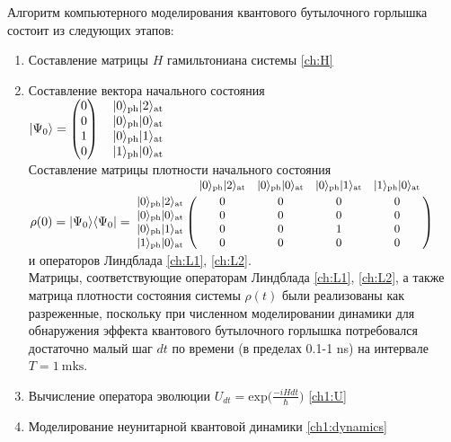 Алгоритм компьютерного моделирования квантового бутылочного горлышка состоит из следующих этапов:
\begin{enumerate}
\item{
	Составление матрицы $H$ гамильтониана системы \eqref{ch:H}\\
}
\item{
Составление вектора начального состояния\\
$
	|\Psi_{0}\rangle = 
	\begin{pmatrix}
		0 \\ 
		0 \\
		1 \\
		0 
	\end{pmatrix}
	\begin{matrix}
    	\quad|0\rangle_{\text{\text{ph}}}|2\rangle_{\text{\text{at}}} \cr
		\quad|0\rangle_{\text{\text{ph}}}|0\rangle_{\text{\text{at}}} \cr
    	\quad|0\rangle_{\text{\text{ph}}}|1\rangle_{\text{\text{at}}} \cr
    	\quad|1\rangle_{\text{\text{ph}}}|0\rangle_{\text{\text{at}}}
	\end{matrix}
$
\\[24pt]
Составление матрицы плотности начального состояния\\[24pt]
$
	\rho(0) = |\Psi_{0}\ra\la\Psi_{0}| =
	{\small	
	\bordermatrix
	{
		&                |0\ra_{\text{\text{ph}}}|2\ra_{\text{\text{at}}} & |0\ra_{\text{\text{ph}}}|0\ra_{\text{\text{at}}} & |0\ra_{\text{\text{ph}}}|1\ra_{\text{\text{at}}} & |1\ra_{\text{\text{ph}}}|0\ra_{\text{\text{at}}} \cr
		|0\ra_{\text{\text{ph}}}|2\ra_{\text{\text{at}}} &      0 &      0 &      0 & 0 \cr
		|0\ra_{\text{\text{ph}}}|0\ra_{\text{\text{at}}} &      0 &      0 &      0 & 0\cr
		|0\ra_{\text{\text{ph}}}|1\ra_{\text{\text{at}}} &      0 &      0 &      1 & 0\cr
		|1\ra_{\text{\text{ph}}}|0\ra_{\text{\text{at}}} &      0 &      0 &      0 & 0\cr
	}
	}
$\\[12pt]
и операторов Линдблада \eqref{ch:L1}, \eqref{ch:L2}.\\

Матрицы, соответствующие операторам Линдблада \eqref{ch:L1}, \eqref{ch:L2}, а также матрица плотности состояния системы $\rho(t)$ были реализованы как разреженные, поскольку при численном моделировании динамики для обнаружения эффекта квантового бутылочного горлышка потребовался достаточно малый шаг $dt$ по времени (в пределах 0.1-1 ns) на интервале $T = 1~\text{mks}$.\\
}
\item{Вычисление оператора эволюции $\displaystyle U_{dt} = \mathrm{exp}\biggl(\frac{-iHdt}{\hbar}\biggr)$ \eqref{ch1:U}}\\
\item{Моделирование неунитарной квантовой динамики \eqref{ch1:dynamics}\\

}
\end{enumerate}
